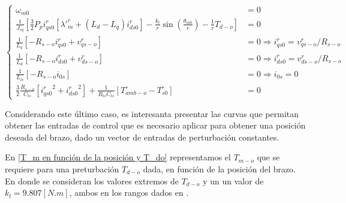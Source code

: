\documentclass[a4paper, 10pt, onecolumn,journal]{ieeeconf}
\begin{document}
\begin{equation}
    \begin{cases}
        \omega_{m0} &= 0\\
        \frac{1}{J_{eq}}\left[\frac{3}{2} P_p i^r_{qs0}\left[\lambda'^r_m + (L_d - L_q) i^r_{ds0} \right] - \frac{k_l}{r}\sin\left(\frac{\theta_{m0}}{r}\right) - \frac{1}{r}T_{d-o}\right] &= 0\\
        \frac{1}{L_q}\left[-R_{s-o} i^r_{qs0} + v^r_{qs-o}\right] &= 0 \Rightarrow i^r_{qs0} = v^r_{qs-o}/R_{s-o}\\ 
        \frac{1}{L_d}\left[-R_{s-o} i^r_{ds0} + v^r_{ds-o}\right] &= 0 \Rightarrow i^r_{ds0} = v^r_{ds-o}/R_{s-o}\\ 
        \frac{1}{L_{ls}}\left[-R_{s-o} i_{0s}\right] &= 0 \Rightarrow i_{0s} = 0\\ 
        \frac{3}{2}\frac{R_{s-o}}{C_{ts}} \left[ {i^r_{qs0}}^2+ {i^r_{ds0}}^2 \right] + \frac{1}{R_{ts}C_{ts}}\left[T^{\circ}_{amb-o} - T_{s0}^{\circ}\right] &= 0
    \end{cases}
    \label{modelo de operacion NL cuasi_estacionario desarrollado reducido}
\end{equation}

Considerando este último caso, es interesanta presentar las curvas que permitan obtener las entradas
de control que es necesario aplicar para obtener una posición deseada
del brazo, dado un vector de entradas de perturbación constantes.

En \cref{T_m en función de la posición y T_do} representamos
el $T_{m-o}$ que se requiere para una preturbación $T_{d-o}$ dada,
en función de la posición del brazo. En donde se
consideran los valores extremos de $T_{d-o}$ y un
un valor de $k_l = 9.807 \left[N.m\right]$, ambos en los rangos
dados en \cite{c1}.
\end{document}
